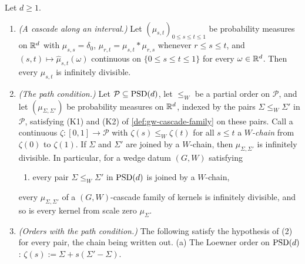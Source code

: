 \begin{theorem}
\label{thm:cascade-infinitely-divisible}
\leanok
Let $d \ge 1$.
\begin{enumerate}
\item \emph{(A cascade along an interval.)} Let $(\mu_{s,t})_{0 \le s \le t \le 1}$ be probability
measures on $\mathbb{R}^d$ with $\mu_{s,s} = \delta_0$, $\mu_{r,t} = \mu_{s,t} * \mu_{r,s}$ whenever
$r \le s \le t$, and $(s,t) \mapsto \widehat\mu_{s,t}(\omega)$ continuous on
$\{0 \le s \le t \le 1\}$ for every $\omega \in \mathbb{R}^d$. Then every $\mu_{s,t}$ is infinitely
divisible.
\item \emph{(The path condition.)} Let $\mathcal P \subseteq \mathrm{PSD}(d)$, let $\le_W$ be a partial order
on $\mathcal P$, and let $(\mu_{\Sigma,\Sigma'})$ be probability measures on $\mathbb{R}^d$, indexed by the
pairs $\Sigma \le_W \Sigma'$ in $\mathcal P$, satisfying (K1) and (K2) of
\ref{def:gw-cascade-family} on these pairs. Call a continuous $\zeta : [0,1] \to \mathcal P$ with
$\zeta(s) \le_W \zeta(t)$ for all $s \le t$ a \emph{$W$-chain} from $\zeta(0)$ to $\zeta(1)$. If
$\Sigma$ and $\Sigma'$ are joined by a $W$-chain, then $\mu_{\Sigma,\Sigma'}$ is infinitely divisible.
In particular, for a wedge datum $(G, W)$ satisfying
\begin{enumerate}
\item[(P)] every pair $\Sigma \le_W \Sigma'$ in $\mathrm{PSD}(d)$ is joined by a $W$-chain,
\end{enumerate}
every $\mu_{\Sigma,\Sigma'}$ of a $(G, W)$-cascade family of kernels is infinitely divisible, and so
is every kernel from scale zero $\mu_\Sigma$.
\item \emph{(Orders with the path condition.)} The following satisfy the hypothesis of (2) for every
pair, the chain being written out.
(a) The Loewner order on $\mathrm{PSD}(d)$: $\zeta(s) := \Sigma + s(\Sigma' - \Sigma)$.

\end{enumerate}
\end{theorem}
